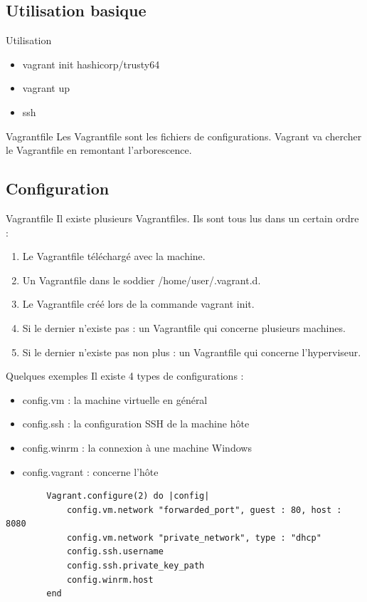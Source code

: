 \documentclass{beamer}
\begin{document}
    \subsection{Utilisation basique}
    \begin{frame}{Utilisation}
        \begin{itemize}
            \item{vagrant init hashicorp/trusty64}
            \item{vagrant up}
            \item{ssh}
        \end{itemize}
        \pause{}
        \begin{block}{Vagrantfile}
            Les Vagrantfile sont les fichiers de configurations. Vagrant va chercher le Vagrantfile en remontant l'arborescence.
        \end{block}
    \end{frame}

    \subsection{Configuration}
    \begin{frame}{Vagrantfile}
        Il existe plusieurs Vagrantfiles. Ils sont tous lus dans un certain ordre :
        \begin{enumerate}
            \item{Le Vagrantfile téléchargé avec la machine.}
            \item{Un Vagrantfile dans le soddier /home/user/.vagrant.d.}
            \item{Le Vagrantfile créé lors de la commande vagrant init.}
            \item{Si le dernier n'existe pas : un Vagrantfile qui concerne plusieurs machines.}
            \item{Si le dernier n'existe pas non plus : un Vagrantfile qui concerne l'hyperviseur.}
        \end{enumerate}
    \end{frame}

    \begin{frame}[containsverbatim]{Quelques exemples}
        Il existe 4 types de configurations :
        \begin{itemize}
            \item{config.vm : la machine virtuelle en général}
            \item{config.ssh : la configuration SSH de la machine hôte}
            \item{config.winrm : la connexion à une machine Windows}
            \item{config.vagrant : concerne l'hôte}
        \end{itemize}
        \begin{verbatim}
        Vagrant.configure(2) do |config|
            config.vm.network "forwarded_port", guest : 80, host : 8080
            config.vm.network "private_network", type : "dhcp"
            config.ssh.username 
            config.ssh.private_key_path
            config.winrm.host
        end
        \end{verbatim}
    \end{frame}
\end{document}
